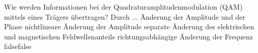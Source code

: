     {Wie werden Informationen bei der Quadraturamplitudenmodulation (QAM) mittels eines Trägers übertragen? Durch ...}
    {Änderung der Amplitude und der Phase}
    {nichtlineare Änderung der Amplitude}
    {separate Änderung des elektrischen und magnetischen Feldwellenanteils}
    {richtungsabhängige Änderung der Frequenz}
    {false}{false}
